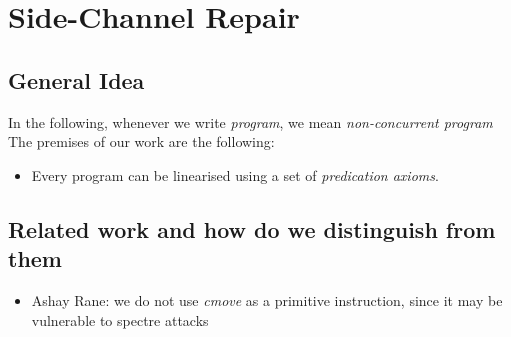 
\newcommand{\branch}[3]{\ensuremath{{#2}\ {+_{#1}}\ {#3}}}
\newcommand{\iterate}[2]{\ensuremath{{#1}^{\left(#2\right)}}}
\newcommand{\bexp}[0]{\ensuremath{\text{BExp}}}
\newcommand{\gexp}[0]{\ensuremath{\text{Exp}}}
\newcommand{\usg}[0]{\ensuremath{\text{u}}}
\newcommand{\sg}[0]{\ensuremath{\text{s}}}
\newcommand{\lbl}[0]{\ensuremath{\text{lbl}}}
\newcommand{\Real}[0]{\ensuremath{\mathbb{R}}}
\newcommand{\letter}[0]{\ensuremath{\left(\text{A-Z\ |\ a-z}\right)}}
\newcommand{\Atom}[0]{\ensuremath{\text{At}}}
\newcommand{\GuardedString}[0]{\ensuremath{\text{GS}}}
\newcommand{\RC}[0]{\ensuremath{\text{RC}}}
\newcommand{\Low}[0]{\ensuremath{\text{Low}}}
\newcommand{\Variable}[0]{\ensuremath{\mathcal{V}}}
\newcommand{\alphanumeric}[0]{\ensuremath{\left(\text{A-Z\ |\ a-z\ |\ 0-9}\right)}}
\newcommand{\alphanumericP}[0]{\ensuremath{\left(\text{A-Z\ |\ a-z\ |\ 0-9\ |\ .\ |\ \_\ |\ \$}\right)}}
\newcommand{\semantics}[1]{\ensuremath{\llbracket #1\rrbracket}}
\newcommand{\valuation}[0]{\ensuremath{\Gamma}}

\chapter{Side-Channel Repair} %

\label{ChapterGKAT} %


\section{General Idea}
In the following, whenever we write \emph{program}, we mean \emph{non-concurrent program}
The premises of our work are the following:
\begin{itemize}
\item Every program can be linearised using a set of \emph{predication axioms}.
\end{itemize}

\section{Related work and how do we distinguish from them}
\begin{itemize}
\item Ashay Rane: we do not use \emph{cmove} as a primitive instruction, since it may be vulnerable to spectre attacks
\end{itemize}

